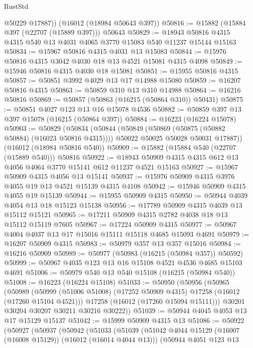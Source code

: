 \begin{lexlean}{RustStd}
\begin{coremodule}
        @50229
        @17887))
    (@16012 (@18984 @50643 @397))
@50816 := @15882 (@15884 @397 (@22707 (@15889 @397))) @50643
@50829 := @18943 @50816 @4315 @4315 @540 @13 @4031 @4065 @3770 @15083 @540 @11237 @15144 @15163
@50834 := @15967 @50816 @4315 @4031 @13 @15083
@50844 := @15976 @50816 @4315 @3042 @4030 @18 @13 @4521 @15081 @4315 @4098
@50849 := @15946 @50816 @4315 @4030 @18 @15081
@50851 := @15955 @50816 @4315
@50857 := @50851 @3992 @4029 @13 @17 @14988 @15080
@50859 := @16207 @50816 @4315
@50863 := @50859 @310 @13 @310 @14988
@50864 := @16216 @50816
@50869 := @50857 (@50863 (@16215 (@50864 @310)) @50431)
@50875 := @50851 @4027 @123 @13 @16 @15078 @4536
@50882 := @50859 @397 @13 @397 @15078 (@16215 (@50864 @397))
@50884 := @16223 (@16224 @15078)
@50903 := @50829
    (@50834
      (@50844
        (@50849 (@50869 (@50875 (@50882 @50884) (@16023 @50816 @4315))))
        @50022
        @50025
        @50028
        @50031
        @17887))
    (@16012 (@18984 @50816 @540))
@50909 := @15882 (@15884 @540 (@22707 (@15889 @540))) @50816
@50922 := @18943 @50909 @4315 @4315 @612 @13 @4056 @4064 @3770 @15141 @612 @11237 @4521 @15163
@50927 := @15967 @50909 @4315 @4056 @13 @15141
@50937 := @15976 @50909 @4315 @3976 @4055 @19 @13 @4521 @15139 @4315 @4108
@50942 := @15946 @50909 @4315 @4055 @19 @15139
@50944 := @15955 @50909 @4315
@50950 := @50944 @4039 @4054 @13 @18 @15123 @15138
@50956 := @17789 @50909 @4315 @4039 @13 @15112 @15121
@50965 := @17211 @50909 @4315 @2782 @4038 @18 @13 @15112 @15119 @7605
@50967 := @17224 @50909 @4315
@50977 := @50967 @4004 @4037 @13 @17 @15016 @15111 @15118 @4685 @15093 @4691
@50979 := @16207 @50909 @4315
@50983 := @50979 @357 @13 @357 @15016
@50984 := @16216 @50909
@50989 := @50977 (@50983 (@16215 (@50984 @357)) @50592)
@50999 := @50967 @4035 @123 @13 @16 @15108 @4521 @4536 @4685 @15103 @4691
@51006 := @50979 @540 @13 @540 @15108 (@16215 (@50984 @540))
@51008 := @16223 (@16224 @15108)
@51033 := @50950
    (@50956
      (@50965
        (@50989
          (@50999 (@51006 @51008) (@17252 @50909 @4315) @17258 (@16012 (@17260 @15104 @4521)))
          @17258
          (@16012 (@17260 @15094 @15111)))
        @30201
        @30204
        @30207
        @30211
        @30216
        @30222))
@51039 := @50944 @4045 @4053 @13 @17 @15129 @15137
@51042 := @15999 @50909 @4315 @13
@51086 := @50922
    (@50927
      (@50937
        (@50942
          (@51033
            (@51039
              (@51042 @4044 @15129 (@16007 (@16008 @15129)) (@16012 (@16014 @4044 @13)))
              (@50944
                @4051
                @123
                @13

\end{coremodule}
\end{lexlean}
